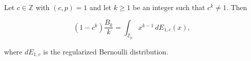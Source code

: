 Let $c \in \mathbb{Z}$ with $(c, p) = 1$ and let $k \geq 1$ be an integer such that
$c^k \neq 1$. Then

$$(1 - c^k) \frac{B_k}{k} = \int_{\mathbb{Z}_p} x^{k-1} \, dE_{1,c}(x),$$

where $dE_{1,c}$ is the regularized Bernoulli distribution.
